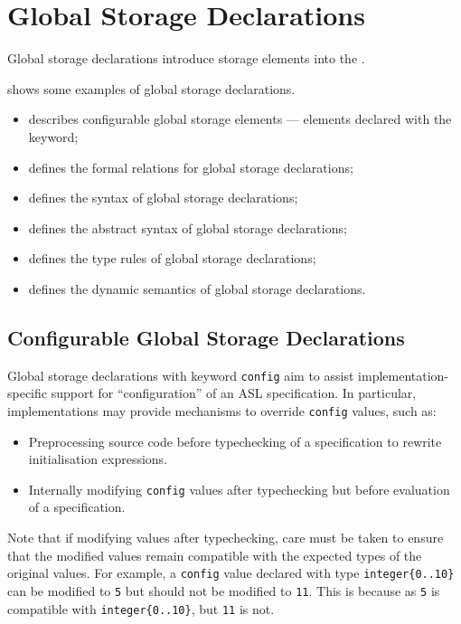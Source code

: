 \chapter{Global Storage Declarations\label{chap:GlobalStorageDeclarations}}

Global storage declarations introduce storage elements into the \globalstaticenvironmentterm.

 shows some examples of global storage declarations.

\ChapterOutline
\begin{itemize}
  \item {} describes configurable global storage elements ---
        elements declared with the \Tconfig{} keyword;
  \item {} defines the formal relations
        for global storage declarations;
  \item {} defines the syntax of global storage declarations;
  \item {} defines the abstract syntax of global storage declarations;
  \item {} defines the type rules of global storage declarations;
  \item {} defines the dynamic semantics of global storage declarations.
\end{itemize}

\section{Configurable Global Storage Declarations\label{sec:ConfigurableGlobalStorageDeclarations}}
Global storage declarations with keyword \texttt{config} aim to assist implementation-specific support for ``configuration'' of an ASL specification.
In particular, implementations may provide mechanisms to override \texttt{config} values, such as:
\begin{itemize}
  \item Preprocessing source code before typechecking of a specification to rewrite initialisation expressions.
  \item Internally modifying \texttt{config} values after typechecking but before evaluation of a specification.
\end{itemize}
Note that if modifying values after typechecking, care must be taken to ensure that the modified values remain compatible with the expected types of the original values.
For example, a \texttt{config} value declared with type \verb|integer{0..10}| can be modified to \texttt{5} but should not be modified to \texttt{11}.
This is because as \texttt{5} is compatible with \verb|integer{0..10}|, but \texttt{11} is not.


